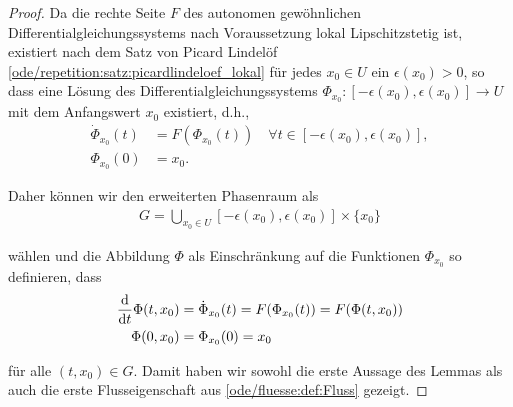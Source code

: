 \begin{proof}
 Da die rechte Seite \(F\) des autonomen gewöhnlichen Differentialgleichungssystems nach Voraussetzung lokal Lipschitzstetig ist, existiert nach dem Satz von Picard Lindelöf \cref{ode/repetition:satz:picardlindeloef_lokal} für jedes \(x_0\in U\) ein \(\epsilon(x_0)>0\), so dass eine Lösung des Differentialgleichungssystems \(\Phi_{x_0} \colon [-\epsilon(x_0),\epsilon(x_0)] \rightarrow U\) mit dem Anfangswert \(x_0\) existiert, d.h.,
\begin{align*}
\dot{\Phi}_{x_0}(t) &= F(\Phi_{x_0}(t)) \quad \forall t \in [-\epsilon(x_0),\epsilon(x_0)],\\
\Phi_{x_0}(0) &= x_0.
\end{align*}
\par
Daher können wir den erweiterten Phasenraum als
\begin{align*}
G = \bigcup_{x_0\in U} [-\epsilon(x_0),\epsilon(x_0)] \times\{x_0\}
\end{align*}
\par
wählen und die Abbildung \(\Phi\) als Einschränkung auf die Funktionen \(\Phi_{x_0}\) so definieren, dass
\begin{align*}
\frac{\mathrm{d}}{\mathrm{d} t} \Phi(t, x_0) &= \dot{\Phi}_{x_0}(t) = F(\Phi_{x_0}(t)) = F(\Phi(t, x_0))\\
\Phi(0, x_0) &= \Phi_{x_0}(0) = x_0
\end{align*}
\par
für alle \((t, x_0)\in G\).
Damit haben wir sowohl die erste Aussage des Lemmas als auch die erste Flusseigenschaft aus \cref{ode/fluesse:def:Fluss} gezeigt.


\end{proof}
